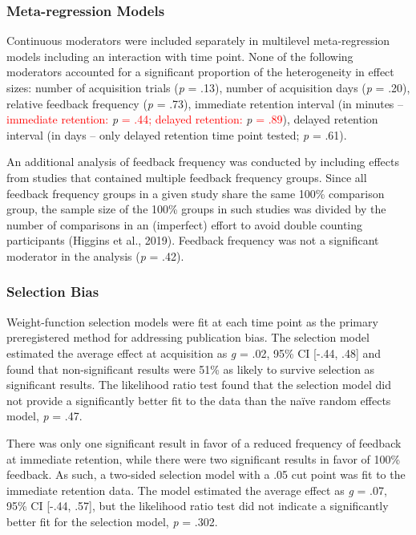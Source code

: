 \documentclass[
  english,
  man, donotrepeattitle,mask,floatsintext]{apa7}
\begin{document}
\hypertarget{meta-regression-models}{%
\subsubsection{Meta-regression Models}\label{meta-regression-models}}

Continuous moderators were included separately in multilevel meta-regression models including an interaction with time point. None of the following moderators accounted for a significant proportion of the heterogeneity in effect sizes: number of acquisition trials (\emph{p} = .13), number of acquisition days (\emph{p} = .20), relative feedback frequency (\emph{p} = .73), immediate retention interval (in minutes -- \textcolor{red}{immediate retention: }\emph{p} \textcolor{red}{= .44; delayed retention: }\emph{p}\textcolor{red}{ = .89}), delayed retention interval (in days -- only delayed retention time point tested; \emph{p} = .61).

An additional analysis of feedback frequency was conducted by including effects from studies that contained multiple feedback frequency groups. Since all feedback frequency groups in a given study share the same 100\% comparison group, the sample size of the 100\% groups in such studies was divided by the number of comparisons in an (imperfect) effort to avoid double counting participants (Higgins et al., 2019). Feedback frequency was not a significant moderator in the analysis (\emph{p} = .42).

\hypertarget{selection-bias}{%
\subsubsection{Selection Bias}\label{selection-bias}}

Weight-function selection models were fit at each time point as the primary preregistered method for addressing publication bias. The selection model estimated the average effect at acquisition as \emph{g} = .02, 95\% CI {[}-.44, .48{]} and found that non-significant results were 51\% as likely to survive selection as significant results. The likelihood ratio test found that the selection model did not provide a significantly better fit to the data than the naïve random effects model, \emph{p} = .47.

There was only one significant result in favor of a reduced frequency of feedback at immediate retention, while there were two significant results in favor of 100\% feedback. As such, a two-sided selection model with a .05 cut point was fit to the immediate retention data. The model estimated the average effect as \emph{g} = .07, 95\% CI {[}-.44, .57{]}, but the likelihood ratio test did not indicate a significantly better fit for the selection model, \emph{p} = .302.
\end{document}
